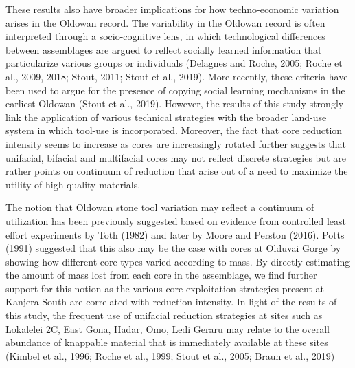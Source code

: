 \documentclass[]{elsarticle} %
\begin{document}
These results also have broader implications for how techno-economic
variation arises in the Oldowan record. The variability in the Oldowan
record is often interpreted through a socio-cognitive lens, in which
technological differences between assemblages are argued to reflect
socially learned information that particularize various groups or
individuals (Delagnes and Roche, 2005; Roche et al., 2009, 2018; Stout,
2011; Stout et al., 2019). More recently, these criteria have been used
to argue for the presence of copying social learning mechanisms in the
earliest Oldowan (Stout et al., 2019). However, the results of this
study strongly link the application of various technical strategies with
the broader land-use system in which tool-use is incorporated. Moreover,
the fact that core reduction intensity seems to increase as cores are
increasingly rotated further suggests that unifacial, bifacial and
multifacial cores may not reflect discrete strategies but are rather
points on continuum of reduction that arise out of a need to maximize
the utility of high-quality materials.

The notion that Oldowan stone tool variation may reflect a continuum of
utilization has been previously suggested based on evidence from
controlled least effort experiments by Toth (1982) and later by Moore
and Perston (2016). Potts (1991) suggested that this also may be the
case with cores at Olduvai Gorge by showing how different core types
varied according to mass. By directly estimating the amount of mass lost
from each core in the assemblage, we find further support for this
notion as the various core exploitation strategies present at Kanjera
South are correlated with reduction intensity. In light of the results
of this study, the frequent use of unifacial reduction strategies at
sites such as Lokalelei 2C, East Gona, Hadar, Omo, Ledi Geraru may
relate to the overall abundance of knappable material that is
immediately available at these sites (Kimbel et al., 1996; Roche et al.,
1999; Stout et al., 2005; Braun et al., 2019)
\end{document}
